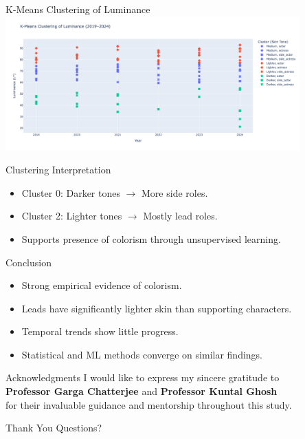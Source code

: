\documentclass{beamer}
\begin{document}
\begin{frame}{K-Means Clustering of Luminance}
  \centering
  \includegraphics[width=0.85\textwidth]{figures/k_means_clustering.png}
\end{frame}

\begin{frame}{Clustering Interpretation}
  \begin{itemize}
    \item Cluster 0: Darker tones $\rightarrow$ More side roles.
    \item Cluster 2: Lighter tones $\rightarrow$ Mostly lead roles.
    \item Supports presence of colorism through unsupervised learning.
  \end{itemize}
\end{frame}

\begin{frame}{Conclusion}
  \begin{itemize}
    \item Strong empirical evidence of colorism.
    \item Leads have significantly lighter skin than supporting characters.
    \item Temporal trends show little progress.
    \item Statistical and ML methods converge on similar findings.
  \end{itemize}
\end{frame}

\begin{frame}{Acknowledgments}
  I would like to express my sincere gratitude to \\ 
  \textbf{Professor Garga Chatterjee} and \textbf{Professor Kuntal Ghosh} \\ 
  for their invaluable guidance and mentorship throughout this study.
\end{frame}

\begin{frame}{Thank You}
  \centering
  \Huge Questions?
\end{frame}
\end{document}
